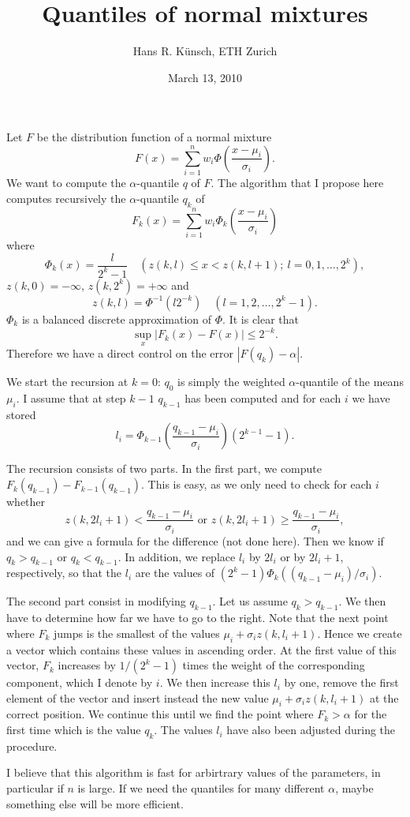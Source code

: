 \documentclass[11pt]{article}
\begin{document}
\title{Quantiles of normal mixtures}
 \author{Hans R. K\"unsch, ETH Zurich}
\date{March 13, 2010}

\maketitle
Let $F$ be the distribution function of a normal mixture
$$F(x) = \sum_{i=1}^n w_i \Phi\left(\frac{x-\mu_i}{\sigma_i}\right).$$
We want to compute the $\alpha$-quantile $q$ of $F$. The algorithm that I
propose here computes recursively the $\alpha$-quantile $q_k$ of
$$F_k(x) = \sum_{i=1}^n w_i \Phi_k\left(\frac{x-\mu_i}{\sigma_i}\right)$$
where 
$$\Phi_k(x) = \frac{l}{2^k-1} \quad (z(k,l) \leq x < z(k,l+1); \
l=0,1,\ldots,2^k),$$ 
$z(k,0)=-\infty$, $z(k,2^k)=+\infty$ and
$$z(k,l) = \Phi^{-1}(l2^{-k}) \quad (l=1,2, \ldots , 2^k-1).$$
$\Phi_k$ is a balanced discrete approximation of $\Phi$. It is
clear that 
$$\sup_x |F_k(x)-F(x)| \leq 2^{-k}.$$
Therefore we have a direct control on the error $|F(q_k)-\alpha|$.

We start the recursion at $k=0$: $q_0$ is simply
the weighted $\alpha$-quantile of the means $\mu_i$. I assume that at step
$k-1$ $q_{k-1}$ has been computed and for each $i$ we have stored 
$$l_i = \Phi_{k-1}\left(\frac{q_{k-1}-\mu_i}{\sigma_i}\right) (2^{k-1}
-1).$$

The recursion consists of two parts. In the first part, we compute
$F_{k}(q_{k-1}) - F_{k-1}(q_{k-1})$. This is easy, as we only need to
check for each $i$ whether
$$z(k,2l_i+1) < \frac{q_{k-1} - \mu_i}{\sigma_i} \textrm{ or } z(k,2l_i+1) \geq
\frac{q_{k-1} - \mu_i}{\sigma_i},$$
and we can give a formula for the difference (not done here). Then we know
if $q_k > q_{k-1}$ or $q_k < q_{k-1}$. In addition, we replace $l_i$ by $2
l_i$ or by $2 l_i+1$, respectively, so that the $l_i$ are the values of
$(2^k-1)\Phi_k((q_{k-1}-\mu_i)/\sigma_i)$. 

The second part consist in modifying $q_{k-1}$. Let us assume $q_k >
q_{k-1}$. We then have to determine how far we have to go to the right.
Note that the next point where $F_k$ jumps is the smallest of the values 
$\mu_i + \sigma_i z(k,l_i+1)$. Hence we create a vector which contains
these values in ascending order. At the first value of this vector, 
$F_k$ increases by $1/(2^k-1)$ times the weight of the corresponding component,
which I denote by $i$. We then increase this $l_i$ by one, remove 
the first element of the vector and insert instead the new value 
$\mu_i + \sigma_i z(k,l_i+1)$ at the correct position. We continue this
until we find the point where $F_k > \alpha$ for the first time
which is the value $q_k$. The values $l_i$ have also been adjusted
during the procedure. 

I believe that this algorithm is fast for arbirtrary values of 
the parameters, in particular if $n$ is large. If we need the
quantiles for many different $\alpha$, maybe something else will
be more efficient. 
\end{document}
